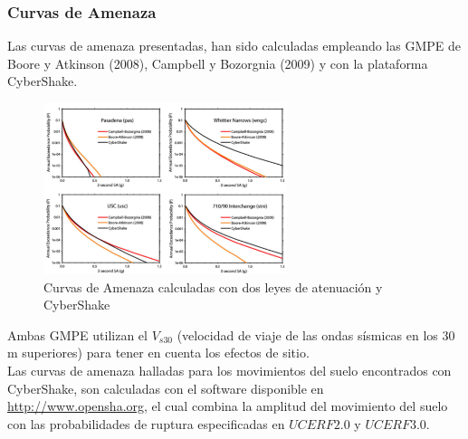 \begin{frame}[allowframebreaks]
\frametitle{Curvas de Amenaza}
%
Las curvas de amenaza presentadas, han sido calculadas empleando las GMPE de Boore y Atkinson (2008), Campbell y Bozorgnia (2009) y con la plataforma CyberShake.
%
\begin{figure}[h]
	\centering
	\includegraphics[height=5cm]{img/CurvasAmenaza.pdf}
	\caption{Curvas de Amenaza calculadas con dos leyes de atenuación y CyberShake \cite[figura 7, página 10]{gravesetal}}
	\vspace{-.5 cm}
\end{figure}
%
\justifying
%
Ambas GMPE utilizan el $V_{s30}$ (velocidad de viaje de las ondas sísmicas en los $30$m superiores) para tener en cuenta los efectos de sitio.\\
%
Las curvas de amenaza halladas para los movimientos del suelo encontrados con CyberShake, son calculadas con el software disponible en \url{http://www.opensha.org}, el cual combina la amplitud del movimiento del suelo con las probabilidades de ruptura especificadas en $UCERF2.0$ y $UCERF3.0$.
%
%
\end{frame}
%
%
